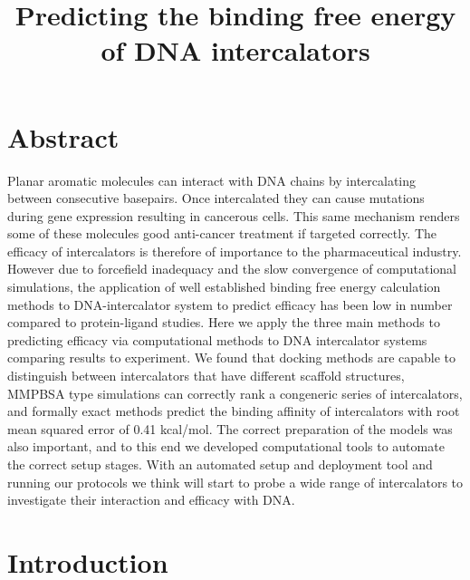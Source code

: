 \documentclass[11pt, a4paper]{article}
\title{Predicting the binding free energy of DNA intercalators}
\begin{document}


\section*{Abstract}

Planar aromatic molecules can interact with DNA chains by intercalating between consecutive basepairs. Once intercalated they can cause mutations during gene expression resulting in cancerous cells. This same mechanism renders some of these molecules good anti-cancer treatment if targeted correctly. The efficacy of intercalators is therefore of importance to the pharmaceutical industry. However due to forcefield inadequacy and the slow convergence of computational simulations, the application of well established binding free energy calculation methods to DNA-intercalator system to predict efficacy has been low in number compared to protein-ligand studies. Here we apply the three main methods to predicting efficacy via computational methods to DNA intercalator systems comparing results to experiment. We found that docking methods are capable to distinguish between intercalators that have different scaffold structures, MMPBSA type simulations can correctly rank a congeneric series of intercalators, and formally exact methods predict the binding affinity of intercalators with root mean squared error of 0.41 kcal/mol. The correct preparation of the models was also important, and to this end we developed computational tools to automate the correct setup stages. With an automated setup and deployment tool and running our protocols we think will start to probe a wide range of intercalators to investigate their interaction and efficacy with DNA.

\section{Introduction}

% 
\end{document}
